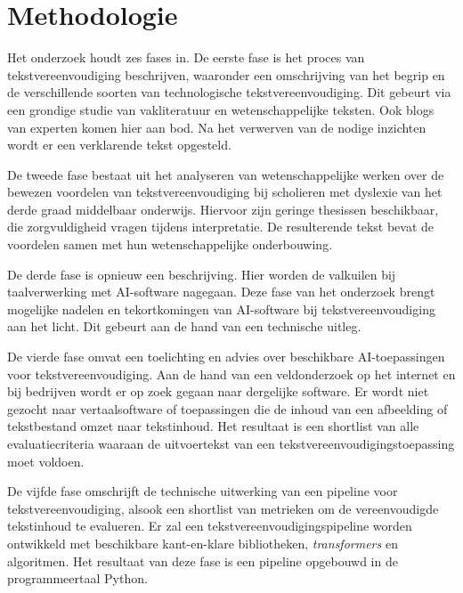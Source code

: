 
\section{Methodologie}%
\label{sec:methodologie}

Het onderzoek houdt zes fases in. De eerste fase is het proces van tekstvereenvoudiging beschrijven, waaronder een omschrijving van het begrip en de verschillende soorten van technologische tekstvereenvoudiging. Dit gebeurt via een grondige studie van vakliteratuur en wetenschappelijke teksten. Ook blogs van experten komen hier aan bod. Na het verwerven van de nodige inzichten wordt er een verklarende tekst opgesteld.

De tweede fase bestaat uit het analyseren van wetenschappelijke werken over de bewezen voordelen van tekstvereenvoudiging bij scholieren met dyslexie van het derde graad middelbaar onderwijs. Hiervoor zijn geringe thesissen beschikbaar, die zorgvuldigheid vragen tijdens interpretatie. De resulterende tekst bevat de voordelen samen met hun wetenschappelijke onderbouwing.

De derde fase is opnieuw een beschrijving. Hier worden de valkuilen bij taalverwerking met AI-software nagegaan. Deze fase van het onderzoek brengt mogelijke nadelen en tekortkomingen van AI-software bij tekstvereenvoudiging aan het licht. Dit gebeurt aan de hand van een technische uitleg.

De vierde fase omvat een toelichting en advies over beschikbare AI-toepassingen voor tekstvereenvoudiging. Aan de hand van een veldonderzoek op het internet en bij bedrijven wordt er op zoek gegaan naar dergelijke software. Er wordt niet gezocht naar vertaalsoftware of toepassingen die de inhoud van een afbeelding of tekstbestand omzet naar tekstinhoud. Het resultaat is een shortlist van alle evaluatiecriteria waaraan de uitvoertekst van een tekstvereenvoudigingstoepassing moet voldoen.

De vijfde fase omschrijft de technische uitwerking van een pipeline voor tekstvereenvoudiging, alsook een shortlist van metrieken om de vereenvoudigde tekstinhoud te evalueren. Er zal een tekstvereenvoudigingspipeline worden ontwikkeld met beschikbare kant-en-klare bibliotheken, \textit{transformers} en algoritmen. Het resultaat van deze fase is een pipeline opgebouwd in de programmeertaal Python. 

